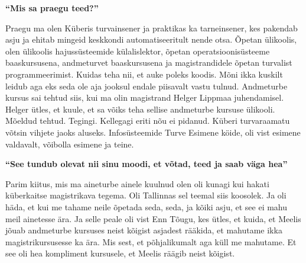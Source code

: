 \textbf{\enquote{Mis sa praegu teed?}}

Praegu ma olen Küberis turvainsener ja praktikas ka tarneinsener, kes pakendab asju ja ehitab mingeid keskkondi automatiseeritult nende otsa. Õpetan ülikoolis, olen ülikoolis hajussüsteemide külalislektor, õpetan operatsioonisüsteeme baaskursusena, andmeturvet baaskursusena ja magistrandidele õpetan turvalist programmeerimist. Kuidas teha nii, et auke poleks koodis. Mõni ikka kuskilt leidub aga eks seda ole aja jooksul endale piisavalt vastu tulnud. Andmeturbe kursus sai tehtud siis, kui ma olin magistrand Helger Lippmaa juhendamisel. Helger ütles, et kuule, et sa võiks teha sellise andmeturbe kursuse ülikooli. Mõeldud tehtud. Tegingi. Kellegagi eriti nõu ei pidanud. Küberi turvaraamatu võtsin vihjete jaoks aluseks. Infosüsteemide Turve Esimene köide, oli vist esimene valdavalt, võibolla esimene ja teine. 


\textbf{\enquote{See tundub olevat nii sinu moodi, et võtad, teed ja saab väga hea}}

Parim kiitus, mis ma aineturbe ainele kuulnud olen oli kunagi kui hakati küberkaitse magistrikava tegema. Oli Tallinnas sel teemal siis koosolek. Ja oli häda, et kui me tahame neile õpetada seda, seda, ja kõiki asju, et see ei mahu meil ainetesse ära. Ja selle peale oli vist Enn Tõugu, kes ütles, et kuida, et Meelis jõuab andmeturbe kursuses neist kõigist asjadest rääkida, et mahutame ikka magistrikursusesse ka ära. Mis sest, et põhjalikumalt aga küll me mahutame. Et see oli hea kompliment kursusele, et Meelis räägib neist kõigist. 


